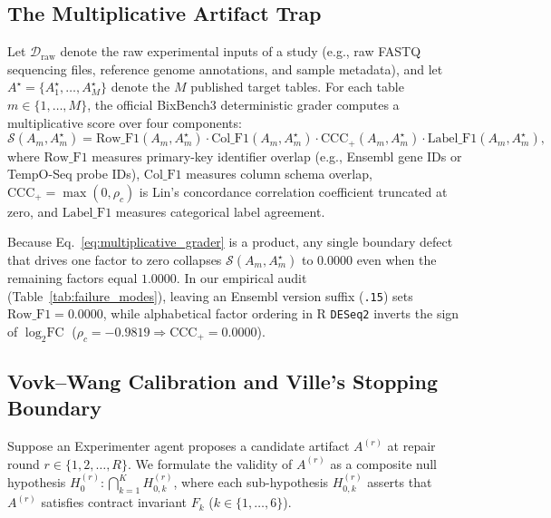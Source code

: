 \documentclass[10pt,twocolumn]{article}
\begin{document}
\subsection{The Multiplicative Artifact Trap}
Let $\mathcal{D}_{\text{raw}}$ denote the raw experimental inputs of a study (e.g., raw FASTQ sequencing files, reference genome annotations, and sample metadata), and let $A^\star = \{A_1^\star, \dots, A_M^\star\}$ denote the $M$ published target tables. For each table $m \in \{1,\dots,M\}$, the official BixBench3 deterministic grader \cite{edison2026bixbench3} computes a multiplicative score over four components:
\begin{equation}
    \mathcal{S}(A_m, A_m^\star) = \text{Row\_F1}(A_m, A_m^\star) \cdot \text{Col\_F1}(A_m, A_m^\star) \cdot \text{CCC}_+(A_m, A_m^\star) \cdot \text{Label\_F1}(A_m, A_m^\star),
    \label{eq:multiplicative_grader}
\end{equation}
where $\text{Row\_F1}$ measures primary-key identifier overlap (e.g., Ensembl gene IDs or TempO-Seq probe IDs), $\text{Col\_F1}$ measures column schema overlap, $\text{CCC}_+ = \max(0, \rho_c)$ is Lin's concordance correlation coefficient \cite{lin1989concordance} truncated at zero, and $\text{Label\_F1}$ measures categorical label agreement.

Because Eq.~\eqref{eq:multiplicative_grader} is a product, any single boundary defect that drives one factor to zero collapses $\mathcal{S}(A_m, A_m^\star)$ to $0.0000$ even when the remaining factors equal $1.0000$. In our empirical audit (Table~\ref{tab:failure_modes}), leaving an Ensembl version suffix (\texttt{.15}) sets $\text{Row\_F1} = 0.0000$, while alphabetical factor ordering in R \texttt{DESeq2} inverts the sign of $\log_2\text{FC}$ ($\rho_c = -0.9819 \Rightarrow \text{CCC}_+ = 0.0000$).

\subsection{Vovk--Wang Calibration and Ville's Stopping Boundary}
Suppose an Experimenter agent proposes a candidate artifact $A^{(r)}$ at repair round $r \in \{1, 2, \dots, R\}$. We formulate the validity of $A^{(r)}$ as a composite null hypothesis $H_0^{(r)}: \bigcap_{k=1}^K H_{0,k}^{(r)}$, where each sub-hypothesis $H_{0,k}^{(r)}$ asserts that $A^{(r)}$ satisfies contract invariant $F_k$ ($k \in \{1,\dots,6\}$).
\end{document}

